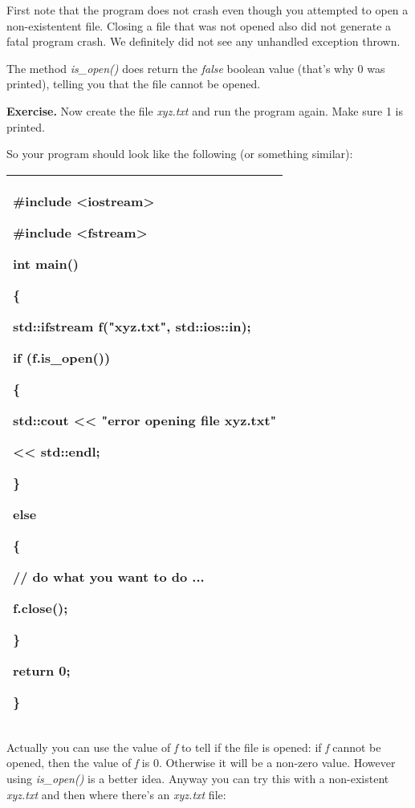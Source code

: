 \documentclass[
]{article}
\begin{document}
First note that the program does not crash even though you attempted to
open a non-existentent file. Closing a file that was not opened also did
not generate a fatal program crash. We definitely did not see any
unhandled exception thrown.

The method \emph{is\_open()} does return the \emph{false} boolean value
(that's why 0 was printed), telling you that the file cannot be opened.

\textbf{Exercise.} Now create the file \emph{xyz.txt} and run the
program again. Make sure 1 is printed.

So your program should look like the following (or something similar):

\begin{longtable}[]{@{}l@{}}
\toprule
\endhead
\begin{minipage}[t]{0.97\columnwidth}\raggedright
\#include \textless iostream\textgreater{}

\#include \textless fstream\textgreater{}

int main()

\{

std::ifstream f("xyz.txt", std::ios::in);

if (\textbf{f.is\_open()})

\{

std::cout \textless\textless{} "error opening file xyz.txt"

\textless\textless{} std::endl;

\}

else

\{

// do what you want to do ...

f.close();

\}

return 0;

\}\strut
\end{minipage}\tabularnewline
\bottomrule
\end{longtable}

Actually you can use the value of \emph{f} to tell if the file is
opened: if \emph{f} cannot be opened, then the value of \emph{f} is 0.
Otherwise it will be a non-zero value. However using \emph{is\_open()}
is a better idea. Anyway you can try this with a non-existent
\emph{xyz.txt} and then where there's an \emph{xyz.txt} file:
\end{document}
